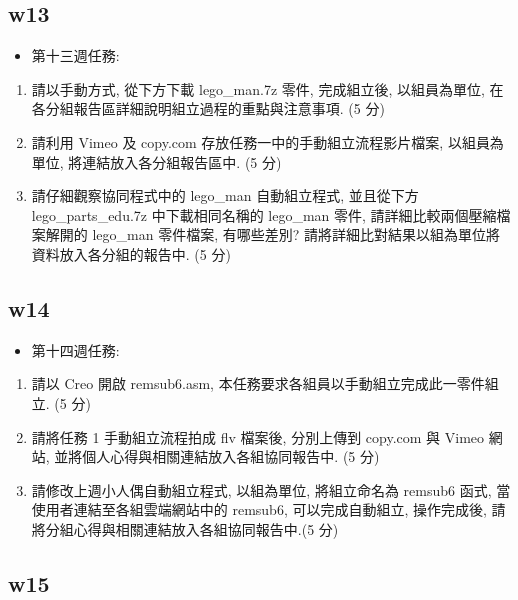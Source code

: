 \documentclass[]{article}
\begin{document}
\subsection{w13}\label{w13-1}

\begin{itemize}
\itemsep1pt\parskip0pt
\item
  第十三週任務:
\end{itemize}

\begin{enumerate}
\def\labelenumi{\arabic{enumi}.}
\item
  請以手動方式, 從下方下載 lego\_man.7z 零件, 完成組立後, 以組員為單位,
  在各分組報告區詳細說明組立過程的重點與注意事項. (5 分)
\item
  請利用 Vimeo 及 copy.com 存放任務一中的手動組立流程影片檔案,
  以組員為單位, 將連結放入各分組報告區中. (5 分)
\item
  請仔細觀察協同程式中的 lego\_man 自動組立程式, 並且從下方
  lego\_parts\_edu.7z 中下載相同名稱的 lego\_man 零件,
  請詳細比較兩個壓縮檔案解開的 lego\_man 零件檔案, 有哪些差別?
  請將詳細比對結果以組為單位將資料放入各分組的報告中. (5 分)
\end{enumerate}

\subsection{w14}\label{w14-1}

\begin{itemize}
\itemsep1pt\parskip0pt
\item
  第十四週任務:
\end{itemize}

\begin{enumerate}
\def\labelenumi{\arabic{enumi}.}
\item
  請以 Creo 開啟 remsub6.asm,
  本任務要求各組員以手動組立完成此一零件組立. (5 分)
\item
  請將任務 1 手動組立流程拍成 flv 檔案後, 分別上傳到 copy.com 與 Vimeo
  網站, 並將個人心得與相關連結放入各組協同報告中. (5 分)
\item
  請修改上週小人偶自動組立程式, 以組為單位, 將組立命名為 remsub6 函式,
  當使用者連結至各組雲端網站中的 remsub6, 可以完成自動組立, 操作完成後,
  請將分組心得與相關連結放入各組協同報告中.(5 分)
\end{enumerate}

\subsection{w15}\label{w15-1}
\end{document}
